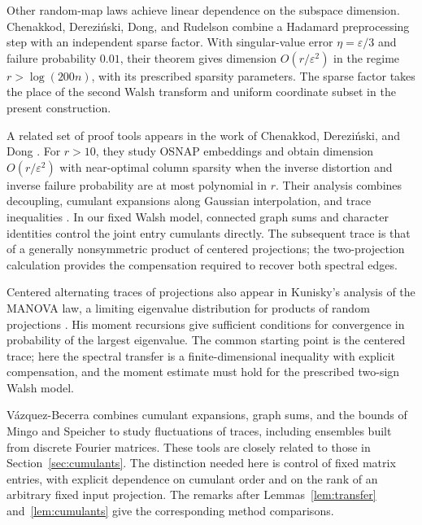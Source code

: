 \documentclass[11pt]{article}
\theoremstyle{definition}
\theoremstyle{remark}
\theoremstyle{plain}
\begin{document}
Other random-map laws achieve linear dependence on the subspace
dimension. Chenakkod, Derezi\'nski, Dong, and Rudelson
\cite[Theorem~4.5]{cddr_sparse} combine a Hadamard preprocessing step
with an independent sparse factor. With singular-value error
$\eta=\varepsilon/3$ and failure probability $0.01$, their theorem
gives dimension $O(r/\varepsilon^2)$ in the regime
$r>\log(200n)$, with its prescribed sparsity parameters.
The sparse factor takes the place of the second Walsh transform
and uniform coordinate subset in the present construction.

A related set of proof tools appears in the work of Chenakkod,
Derezi\'nski, and Dong \cite[Theorems~3 and~7]{cdd_icalp2025}.
For $r>10$, they study OSNAP embeddings and obtain dimension $O(r/\varepsilon^2)$
with near-optimal column sparsity when the inverse distortion and
inverse failure probability are at most polynomial in $r$.
Their analysis combines decoupling, cumulant expansions along
Gaussian interpolation, and trace inequalities
\cite[Section~4; full version, Sections~7.2--7.5]{cdd_icalp2025}.
In our fixed Walsh model, connected graph
sums and character identities control the joint entry cumulants
directly. The subsequent trace is that of a generally nonsymmetric
product of centered projections; the two-projection calculation
provides the compensation required to recover both spectral edges.

Centered alternating traces of projections also appear in Kunisky's
analysis of the MANOVA law, a limiting eigenvalue distribution
for products of random projections
\cite[Theorems~1.5 and~1.12]{kunisky_manova}.
His moment recursions give sufficient conditions for convergence
in probability of the largest eigenvalue. The common starting point is the
centered trace; here the spectral transfer is a finite-dimensional
inequality with explicit compensation, and the moment estimate
must hold for the prescribed two-sign Walsh model.

V\'azquez-Becerra \cite[Section~4]{vazquez_becerra} combines
cumulant expansions, graph sums, and the bounds of Mingo and
Speicher to study fluctuations of traces, including ensembles
built from discrete Fourier matrices. These tools are closely
related to those in Section~\ref{sec:cumulants}. The distinction
needed here is control of fixed matrix entries, with explicit
dependence on cumulant order and on the rank of an arbitrary
fixed input projection. The remarks after
Lemmas~\ref{lem:transfer} and~\ref{lem:cumulants} give the
corresponding method comparisons.
\end{document}
